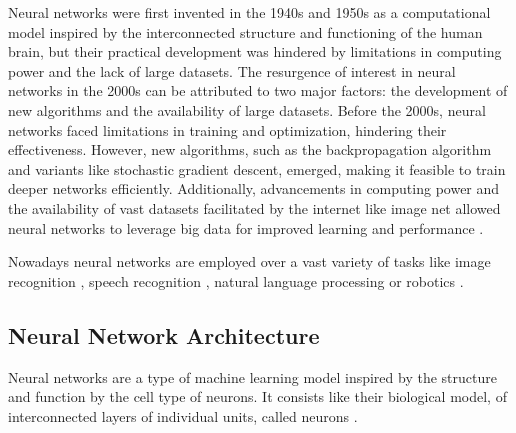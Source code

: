 Neural networks were first invented in the 1940s and 1950s as a computational model inspired by the interconnected structure and functioning of the human brain, but their practical development was hindered by limitations in computing power and the lack of large datasets. 
The resurgence of interest in neural networks in the 2000s can be attributed to two major factors: the development of new algorithms and the availability of large datasets. Before the 2000s, neural networks faced limitations in training and optimization, hindering their effectiveness. However, new algorithms, such as the backpropagation algorithm and variants like stochastic gradient descent, emerged, making it feasible to train deeper networks efficiently. Additionally, advancements in computing power and the availability of vast datasets facilitated by the internet like image net \cite{ImageNet} allowed neural networks to leverage big data for improved learning and performance \cite{VGG16} \cite{ResNet50}.

Nowadays neural networks are employed over a vast variety of tasks like image recognition \cite{VGG16}, speech recognition \cite{DL_SpeechRecognition}, natural language processing \cite{DL_NLP} or robotics \cite{DL_Robotics}. 

\subsection{Neural Network Architecture}


Neural networks are a type of machine learning model inspired by the structure and function by the cell type of neurons. It consists like their biological model, of interconnected layers of individual units, called neurons \cite{DeepLearningTextBook}.

